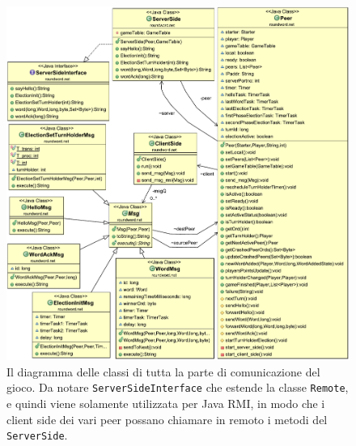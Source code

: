 \documentclass[9pt]{article}
\begin{document}
\begin{figure}
	\centering
		\includegraphics[scale=0.65]{imgs/ClassDiagram2.pdf}
		\caption{Il diagramma delle classi di tutta la parte di comunicazione del gioco. Da notare \texttt{ServerSideInterface} che estende la classe \texttt{Remote}, e quindi viene solamente utilizzata per Java RMI, in modo che i client side dei vari peer possano chiamare in remoto i metodi del \texttt{ServerSide}.}
		\label{fig:class_diagram2}
\end{figure}
\end{document}
